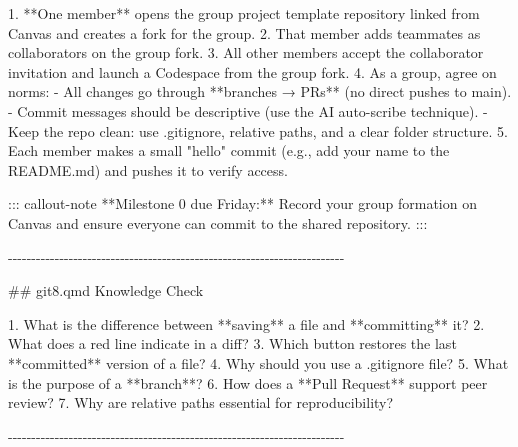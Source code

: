 \documentclass[
  letterpaper,
  DIV=11,
  numbers=noendperiod,
  oneside]{scrreprt}
\newenvironment{Shaded}{\begin{snugshade}}{\end{snugshade}}
\newcommand{\FunctionTok}[1]{\textcolor[rgb]{0.28,0.35,0.67}{#1}}
\newcommand{\InformationTok}[1]{\textcolor[rgb]{0.37,0.37,0.37}{#1}}
\newcommand{\NormalTok}[1]{\textcolor[rgb]{0.00,0.23,0.31}{#1}}
\newcommand{\SpecialStringTok}[1]{\textcolor[rgb]{0.13,0.47,0.30}{#1}}
\begin{document}
\begin{Shaded}
\begin{Highlighting}[numbers=left,,]
\SpecialStringTok{1.  }\NormalTok{**One member** opens the group project template repository linked from Canvas and creates a fork for the group.}
\SpecialStringTok{2.  }\NormalTok{That member adds teammates as collaborators on the group fork.}
\SpecialStringTok{3.  }\NormalTok{All other members accept the collaborator invitation and launch a Codespace from the group fork.}
\SpecialStringTok{4.  }\NormalTok{As a group, agree on norms:}
\SpecialStringTok{    {-}   }\NormalTok{All changes go through **branches → PRs** (no direct pushes to }\InformationTok{\textasciigrave{}main\textasciigrave{}}\NormalTok{).}
\SpecialStringTok{    {-}   }\NormalTok{Commit messages should be descriptive (use the AI auto{-}scribe technique).}
\SpecialStringTok{    {-}   }\NormalTok{Keep the repo clean: use }\InformationTok{\textasciigrave{}.gitignore\textasciigrave{}}\NormalTok{, relative paths, and a clear folder structure.}
\SpecialStringTok{5.  }\NormalTok{Each member makes a small "hello" commit (e.g., add your name to the }\InformationTok{\textasciigrave{}README.md\textasciigrave{}}\NormalTok{) and pushes it to verify access.}

\NormalTok{::: callout{-}note}
\NormalTok{**Milestone 0 due Friday:** Record your group formation on Canvas and ensure everyone can commit to the shared repository.}
\NormalTok{:::}

\NormalTok{{-}{-}{-}{-}{-}{-}{-}{-}{-}{-}{-}{-}{-}{-}{-}{-}{-}{-}{-}{-}{-}{-}{-}{-}{-}{-}{-}{-}{-}{-}{-}{-}{-}{-}{-}{-}{-}{-}{-}{-}{-}{-}{-}{-}{-}{-}{-}{-}{-}{-}{-}{-}{-}{-}{-}{-}{-}{-}{-}{-}{-}{-}{-}{-}{-}{-}{-}{-}{-}{-}{-}{-}}

\FunctionTok{\#\# \textasciigrave{}git8.qmd\textasciigrave{} Knowledge Check}

\SpecialStringTok{1.  }\NormalTok{What is the difference between **saving** a file and **committing** it?}
\SpecialStringTok{2.  }\NormalTok{What does a red line indicate in a diff?}
\SpecialStringTok{3.  }\NormalTok{Which button restores the last **committed** version of a file?}
\SpecialStringTok{4.  }\NormalTok{Why should you use a }\InformationTok{\textasciigrave{}.gitignore\textasciigrave{}}\NormalTok{ file?}
\SpecialStringTok{5.  }\NormalTok{What is the purpose of a **branch**?}
\SpecialStringTok{6.  }\NormalTok{How does a **Pull Request** support peer review?}
\SpecialStringTok{7.  }\NormalTok{Why are relative paths essential for reproducibility?}

\NormalTok{{-}{-}{-}{-}{-}{-}{-}{-}{-}{-}{-}{-}{-}{-}{-}{-}{-}{-}{-}{-}{-}{-}{-}{-}{-}{-}{-}{-}{-}{-}{-}{-}{-}{-}{-}{-}{-}{-}{-}{-}{-}{-}{-}{-}{-}{-}{-}{-}{-}{-}{-}{-}{-}{-}{-}{-}{-}{-}{-}{-}{-}{-}{-}{-}{-}{-}{-}{-}{-}{-}{-}{-}}


\end{Highlighting}
\end{Shaded}
\end{document}
